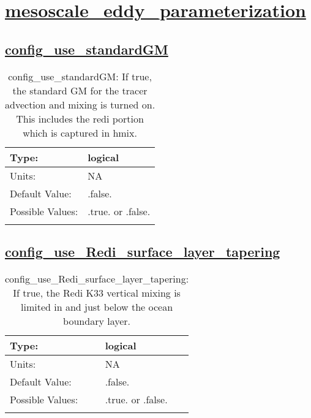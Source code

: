 \section[mesoscale\_eddy\_parameterization]{\hyperref[sec:nm_tab_mesoscale_eddy_parameterization]{mesoscale\_eddy\_parameterization}}
\label{sec:nm_sec_mesoscale_eddy_parameterization}
\subsection[config\_use\_standardGM]{\hyperref[sec:nm_tab_mesoscale_eddy_parameterization]{config\_use\_standardGM}}
\label{subsec:nm_sec_config_use_standardGM}
\begin{center}
\begin{longtable}{| p{2.0in} || p{4.0in} |}
    \hline
    Type: & logical \\
    \hline
    Units: & \si{NA} \\
    \hline
    Default Value: & .false. \\
    \hline
    Possible Values: & .true. or .false. \\
    \hline
    \caption{config\_use\_standardGM: If true, the standard GM for the tracer advection and mixing is turned on. This includes the redi portion which is captured in hmix.}
\end{longtable}
\end{center}
\subsection[config\_use\_Redi\_surface\_layer\_tapering]{\hyperref[sec:nm_tab_mesoscale_eddy_parameterization]{config\_use\_Redi\_surface\_layer\_tapering}}
\label{subsec:nm_sec_config_use_Redi_surface_layer_tapering}
\begin{center}
\begin{longtable}{| p{2.0in} || p{4.0in} |}
    \hline
    Type: & logical \\
    \hline
    Units: & \si{NA} \\
    \hline
    Default Value: & .false. \\
    \hline
    Possible Values: & .true. or .false. \\
    \hline
    \caption{config\_use\_Redi\_surface\_layer\_tapering: If true, the Redi K33 vertical mixing is limited in and just below the ocean boundary layer.}
\end{longtable}
\end{center}
